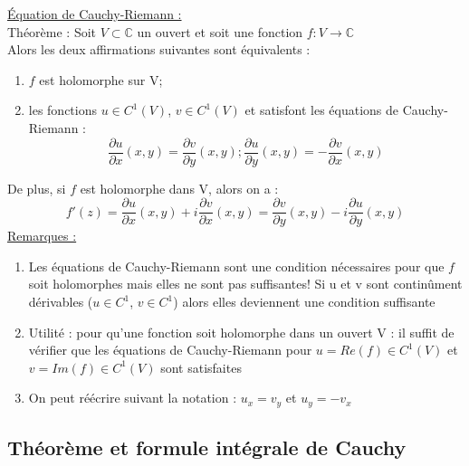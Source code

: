 \documentclass[../main.tex]{subfiles}
\begin{document}
\quad \underline{Équation de Cauchy-Riemann :}\\
Théorème : Soit $V\subset \mathbb{C}$ un ouvert et soit une fonction $f:V\rightarrow \mathbb{C}$\\
Alors les deux affirmations suivantes sont équivalents : \\
\begin{enumerate}
    \item $f$ est holomorphe sur V;\\
    \item les fonctions $u\in C^1(V)$, $v\in C^1(V)$ et satisfont les équations de Cauchy-Riemann : 
    \begin{equation}
        \frac{\partial u}{\partial x} (x,y) = \frac{\partial v}{\partial y}(x,y); \frac{\partial u}{\partial y} (x,y) = -\frac{\partial v}{\partial x}(x,y)
    \end{equation}
\end{enumerate}
De plus, si $f$ est holomorphe dans V, alors on a :\\
\begin{equation}
    f'(z) = \frac{\partial u}{\partial x} (x,y) + i \frac{\partial v}{\partial x}(x,y) = \frac{\partial v}{\partial y} (x,y) - i \frac{\partial u}{\partial y}(x,y)
\end{equation}
\color{gray}
\underline{Remarques :} \begin{enumerate}
    \item Les équations de Cauchy-Riemann sont une condition nécessaires pour que $f$ soit holomorphes mais elles ne sont pas suffisantes! Si u et v sont continûment dérivables ($u \in C^1$, $v\in C^1$) alors elles deviennent une condition suffisante\\
    \item Utilité : pour qu'une fonction soit holomorphe dans un ouvert V : il suffit de vérifier que les équations de Cauchy-Riemann pour $u=Re(f) \in C^1(V)$ et $v=Im(f) \in C^1(V)$ sont satisfaites\\
    \item On peut réécrire suivant la notation : $u_x=v_y$ et $u_y=-v_x$\\
\end{enumerate}
\color{black}

\subsection{Théorème et formule intégrale de Cauchy}
\end{document}
